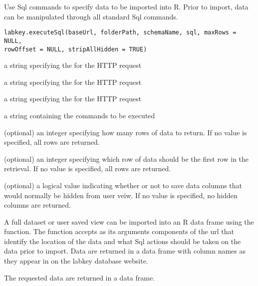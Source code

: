 \begin{Description}\relax
Use Sql commands to specify data to be imported into R. Prior to import, data can
be manipulated through all standard Sql commands.
\end{Description}
\begin{Usage}
\begin{verbatim}
labkey.executeSql(baseUrl, folderPath, schemaName, sql, maxRows = NULL, 
rowOffset = NULL, stripAllHidden = TRUE)
\end{verbatim}
\end{Usage}
\begin{Arguments}
\begin{ldescription}
\item[\code{baseUrl}] a string specifying the for the HTTP request
\item[\code{folderPath}] a string specifying the  for the HTTP request
\item[\code{schemaName}] a string specifying the   for the HTTP request
\item[\code{sql}] a string containing the  commands to be executed
\item[\code{maxRows}] (optional) an integer specifying how many rows of data to return. If no value is specified, all rows are returned.
\item[\code{rowOffset}] (optional) an integer specifying which row of data should be the first row in the retrieval. 
If no value is specified, all rows are returned.
\item[\code{stripAllHidden}] (optional) a logical value indicating whether or not to save data columns that would 
normally be hidden from user veiw. If no value is specified, no hidden columns are returned.
\end{ldescription}
\end{Arguments}
\begin{Details}\relax
A full dataset or user saved view can be imported into an R data frame using the 
function. The function accepts as its arguments components of the url that identify the location of the
data and what Sql actions should be taken on the data prior to import. Data are returned in a data frame
with column names as they appear in on the labkey database website.
\end{Details}
\begin{Value}
The requested data are returned in a data frame.
\end{Value}

